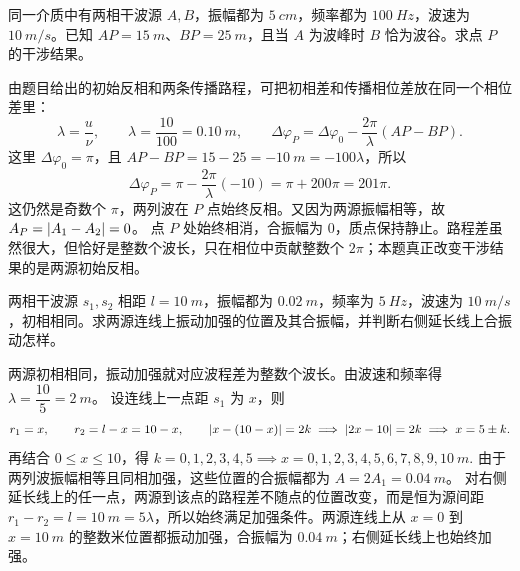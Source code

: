 \documentclass[lang=cn,11pt]{elegantbook}
\begin{document}
\begin{exercise}
同一介质中有两相干波源 \(A,B\)，振幅都为 \(\SI{5}{cm}\)，频率都为 \(\SI{100}{Hz}\)，波速为 \(\SI{10}{m/s}\)。已知 \(AP=\SI{15}{m}\)、\(BP=\SI{25}{m}\)，且当 \(A\) 为波峰时 \(B\) 恰为波谷。求点 \(P\) 的干涉结果。
\end{exercise}

\begin{solution}
由题目给出的初始反相和两条传播路程，可把初相差和传播相位差放在同一个相位差里：
\[
\lambda=\frac{u}{\nu},\qquad
\lambda=\frac{10}{100}=\SI{0.10}{m},\qquad
\Delta\varphi_P=\Delta\varphi_0-\frac{2\pi}{\lambda}(AP-BP).
\]
这里 \(\Delta\varphi_0=\pi\)，且 \(AP-BP=15-25=-\SI{10}{m}=-100\lambda\)，所以
\[
\Delta\varphi_P
=\pi-\frac{2\pi}{\lambda}(-10)
=\pi+200\pi
=201\pi.
\]
这仍然是奇数个 \(\pi\)，两列波在 \(P\) 点始终反相。又因为两源振幅相等，故 \(A_P=\abs{A_1-A_2}=0\)。
点 \(P\) 处始终相消，合振幅为 \(0\)，质点保持静止。路程差虽然很大，但恰好是整数个波长，只在相位中贡献整数个 \(2\pi\)；本题真正改变干涉结果的是两源初始反相。
\end{solution}

\begin{exercise}[两相干波源连线上哪些位置始终加强]
两相干波源 \(s_1,s_2\) 相距 \(l=\SI{10}{m}\)，振幅都为 \(\SI{0.02}{m}\)，频率为 \(\SI{5}{Hz}\)，波速为 \(\SI{10}{m/s}\)，初相相同。求两源连线上振动加强的位置及其合振幅，并判断右侧延长线上合振动怎样。
\end{exercise}

\begin{solution}
两源初相相同，振动加强就对应波程差为整数个波长。由波速和频率得 \(\lambda=\dfrac{10}{5}=\SI{2}{m}\)。
设连线上一点距 \(s_1\) 为 \(x\)，则
\[
r_1=x,\qquad r_2=l-x=10-x,\qquad
\abs{x-(10-x)}=2k
\implies \abs{2x-10}=2k
\implies x=5\pm k.
\]
再结合 \(0\le x\le 10\)，得
 \(k=0,1,2,3,4,5 \implies x=0,1,2,3,4,5,6,7,8,9,10\ \si{m}.\) 
由于两列波振幅相等且同相加强，这些位置的合振幅都为 \(A=2A_1=\SI{0.04}{m}\)。
对右侧延长线上的任一点，两源到该点的路程差不随点的位置改变，而是恒为源间距 \(r_1-r_2=l=\SI{10}{m}=5\lambda\)，所以始终满足加强条件。两源连线上从 \(x=0\) 到 \(x=\SI{10}{m}\) 的整数米位置都振动加强，合振幅为 \(\SI{0.04}{m}\)；右侧延长线上也始终加强。
\end{solution}
\end{document}
